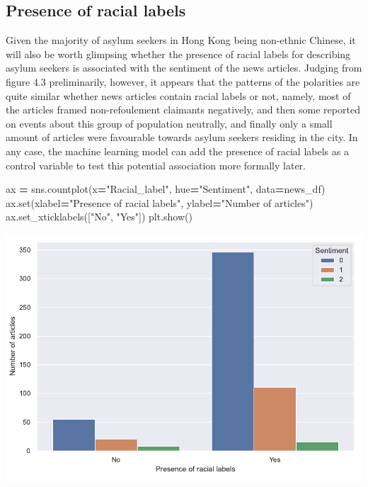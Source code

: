 \documentclass[a4paper, oneside]{report}
\newenvironment{Shaded}{\begin{snugshade}}{\end{snugshade}}
\newcommand{\BuiltInTok}[1]{#1}
\newcommand{\NormalTok}[1]{#1}
\newcommand{\OperatorTok}[1]{\textcolor[rgb]{0.81,0.36,0.00}{\textbf{#1}}}
\newcommand{\StringTok}[1]{\textcolor[rgb]{0.31,0.60,0.02}{#1}}
\renewenvironment{Shaded}
{
  \vspace{4pt}%
  \begin{snugshade}%
}{%
  \end{snugshade}%
  \vspace{4pt}%
}
\begin{document}
\hypertarget{presence-of-racial-labels}{%
\subsection{Presence of racial labels}\label{presence-of-racial-labels}}

Given the majority of asylum seekers in Hong Kong being non-ethnic
Chinese, it will also be worth glimpsing whether the presence of racial
labels for describing asylum seekers is associated with the sentiment of
the news articles. Judging from figure 4.3 preliminarily, however, it
appears that the patterns of the polarities are quite similar whether
news articles contain racial labels or not, namely, most of the articles
framed non-refoulement claimants negatively, and then some reported on
events about this group of population neutrally, and finally only a
small amount of articles were favourable towards asylum seekers residing
in the city. In any case, the machine learning model can add the
presence of racial labels as a control variable to test this potential
association more formally later.

\begin{Shaded}
\begin{Highlighting}[]
\NormalTok{ax }\OperatorTok{=}\NormalTok{ sns.countplot(x}\OperatorTok{=}\StringTok{"Racial\_label"}\NormalTok{, hue}\OperatorTok{=}\StringTok{"Sentiment"}\NormalTok{, data}\OperatorTok{=}\NormalTok{news\_df)}
\NormalTok{ax.}\BuiltInTok{set}\NormalTok{(xlabel}\OperatorTok{=}\StringTok{"Presence of racial labels"}\NormalTok{, ylabel}\OperatorTok{=}\StringTok{"Number of articles"}\NormalTok{)}
\NormalTok{ax.set\_xticklabels([}\StringTok{"No"}\NormalTok{, }\StringTok{"Yes"}\NormalTok{])}
\NormalTok{plt.show()}
\end{Highlighting}
\end{Shaded}

\includegraphics{versions/Chin_Chapter_4_2022-01-10_files/figure-latex/unnamed-chunk-5-1.pdf}
\end{document}
